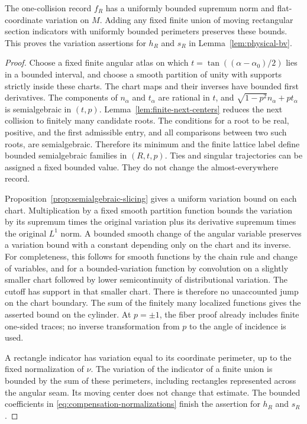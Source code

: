 \begin{proposition}
\label{prop:physical-chart-gluing}
The one-collision record $f_R$ has a uniformly bounded supremum norm
and flat-coordinate variation on $M$. Adding any fixed finite union
of moving rectangular section indicators with uniformly bounded
perimeters preserves these bounds. This proves the variation assertions
for $h_R$ and $s_R$ in Lemma~\ref{lem:physical-bv}.
\end{proposition}
\begin{proof}
Choose a fixed finite angular atlas on which
$t=\tan((\alpha-\alpha_0)/2)$ lies in a bounded interval, and choose a
smooth partition of unity with supports strictly inside these charts.
The chart maps and their inverses have bounded first derivatives.
The components of $n_\alpha$ and $t_\alpha$ are rational in $t$, and
$\sqrt{1-p^2}n_\alpha+pt_\alpha$ is semialgebraic in $(t,p)$.
Lemma~\ref{lem:finite-next-centers} reduces the next collision to
finitely many candidate roots. The conditions for a root to be real,
positive, and the first admissible entry, and all comparisons between
two such roots, are semialgebraic. Therefore its minimum and the finite
lattice label define bounded semialgebraic families in $(R,t,p)$.
Ties and singular trajectories can be assigned a fixed bounded value.
They do not change the almost-everywhere record.

Proposition~\ref{prop:semialgebraic-slicing} gives a uniform variation
bound on each chart. Multiplication by a fixed smooth partition
function bounds the variation by its supremum times the original
variation plus its derivative supremum times the original $L^1$ norm.
A bounded smooth change of the angular variable preserves a variation
bound with a constant depending only on the chart and its inverse.
For completeness, this follows for smooth functions by the chain rule
and change of variables, and for a bounded-variation function by
convolution on a slightly smaller chart followed by lower semicontinuity
of distributional variation. The cutoff has support in that smaller
chart. There is therefore no unaccounted jump on the chart boundary.
The sum of the finitely many localized functions gives the asserted
bound on the cylinder. At $p=\pm1$, the fiber proof already includes
finite one-sided traces; no inverse transformation from $p$ to the
angle of incidence is used.

A rectangle indicator has variation equal to its coordinate perimeter,
up to the fixed normalization of $\nu$. The variation of the indicator
of a finite union is bounded by the sum of these perimeters, including
rectangles represented across the angular seam. Its moving center does
not change that estimate. The bounded coefficients in
\eqref{eq:compensation-normalizations} finish the assertion for $h_R$
and $s_R$.
\end{proof}

